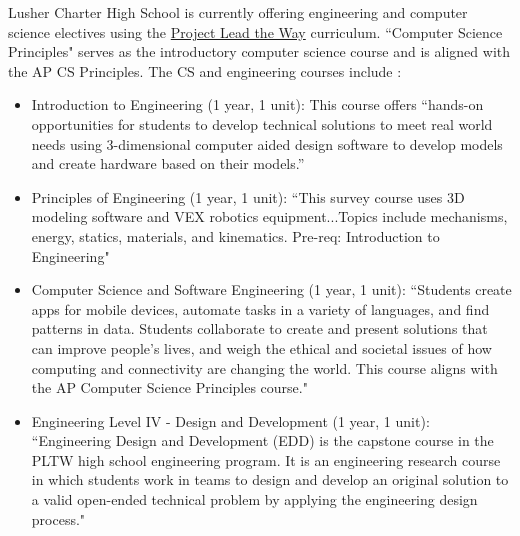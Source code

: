 Lusher Charter High School is currently offering engineering and computer science electives using the \href{https://www.pltw.org/}{Project Lead the Way} curriculum. ``Computer Science Principles" serves as the introductory computer science course and is aligned with the AP CS Principles. The CS and engineering courses include \cite{lusherhigh}:
\begin{itemize}
	\item Introduction to Engineering (1 year, 1 unit): This course offers ``hands-on opportunities for students to develop technical solutions to meet real world needs using 3-dimensional computer aided design software to develop models and create hardware based on their models.''
	\item Principles of Engineering (1 year, 1 unit): ``This survey course uses 3D modeling software and VEX robotics equipment...Topics include mechanisms, energy, statics, materials, and kinematics. Pre-req: Introduction to Engineering"
	\item Computer Science and Software Engineering (1 year, 1 unit): ``Students create apps for mobile devices, automate tasks in a
variety of languages, and find patterns in data. Students collaborate to create and present solutions that can improve people’s lives, and weigh the ethical and societal issues of how computing and connectivity are changing the world. This course aligns with the AP Computer Science Principles course."
	\item Engineering Level IV - Design and Development (1 year, 1 unit): ``Engineering Design and Development (EDD) is the capstone course in the PLTW high school engineering program. It is an engineering research course in which students work in teams to design and develop an original solution to a valid open-ended technical problem by applying the engineering design process."
\end{itemize}

